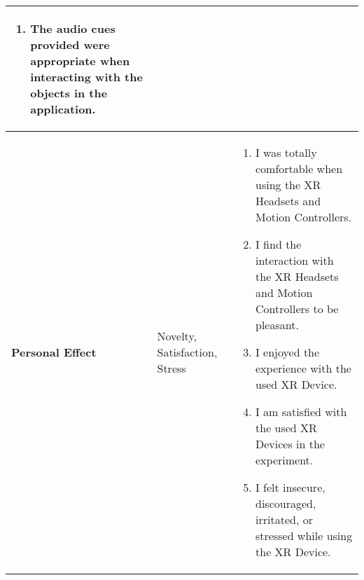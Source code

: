 \documentclass{article}
\begin{document}
\begin{itemize}
\begin{table}[htb]
\begin{tabular}{| m{3cm} | m{3cm} | m{8cm} |}
\begin{enumerate}
				      \item The audio cues provided were appropriate when interacting with the objects in the application.
			      \end{enumerate}                                                                               \\
			      \hline
			      \textbf{Personal Effect} & Novelty, Satisfaction, Stress                       &
			      \begin{enumerate}
				      \item I was totally comfortable when using the XR Headsets and Motion Controllers.
				      \item I find the interaction with the XR Headsets and Motion Controllers to be pleasant.
				      \item I enjoyed the experience with the used XR Device.
				      \item I am satisfied with the used XR Devices in the experiment.
				      \item I felt insecure, discouraged, irritated, or stressed while using the XR Device.
			      \end{enumerate}                                                                               \\
			      \hline
		      \end{tabular}
	      \end{table}

\end{itemize}
\end{document}
